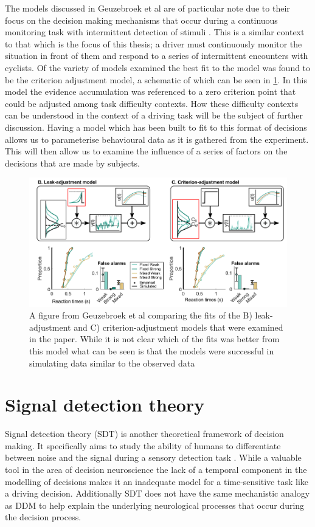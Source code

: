 The models discussed in Geuzebroek et al are of particular note due to their focus on the decision making mechanisms that occur during a continuous monitoring task with intermittent detection of stimuli \cite{geuzebroekBalancingTrueFalse2023}. This is a similar context to that which is the focus of this thesis; a driver must continuously monitor the situation in front of them and respond to a series of intermittent encounters with cyclists. Of the variety of models examined the best fit to the model was found to be the criterion adjustment model, a schematic of which can be seen in \ref{fig:Anna}. In this model the evidence accumulation was referenced to a zero criterion point that could be adjusted among task difficulty contexts. How these difficulty contexts can be understood in the context of a driving task will be the subject of further discussion.
Having a model which has been built to fit to this format of decisions allows us to parameterise behavioural data as it is gathered from the experiment. This will then allow us to examine the influence of a series of factors on the decisions that are made by subjects.
\begin{figure}
    \centering
    \includegraphics[width=0.75\linewidth]{figures/Anna.PNG}
    \caption{A figure from Geuzebroek et al comparing the fits of the B) leak-adjustment and C) criterion-adjustment models that were examined in the paper. While it is not clear which of the fits was better from this model what can be seen is that the models were successful in simulating data similar to the observed data \cite{geuzebroekBalancingTrueFalse2023}}
    \label{fig:Anna}
\end{figure}

\section{Signal detection theory}
Signal detection theory (SDT) is another theoretical framework of decision making. It specifically aims to study the ability of humans to differentiate between noise and the signal during a sensory detection task \cite{fredericka.a.kingdomSignalDetectionMeasures2016}. While a valuable tool in the area of decision neuroscience the lack of a temporal component in the modelling of decisions makes it an inadequate model for a time-sensitive task like a driving decision. Additionally SDT does not have the same mechanistic analogy as DDM to help explain the underlying neurological processes that occur during the decision process.
